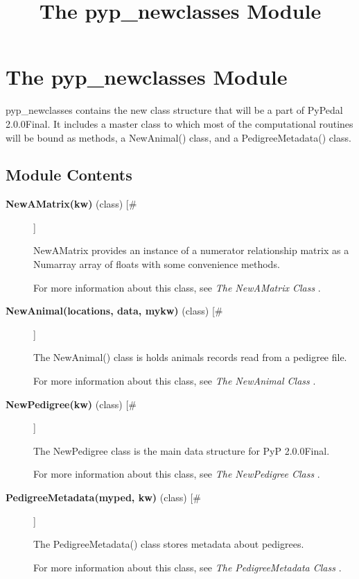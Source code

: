 \documentclass[10pt]{article}
\title{The pyp\_newclasses Module}
\begin{document}
\section*{The pyp\_newclasses Module}


 pyp\_newclasses contains the new class structure that will be a part of PyPedal 2.0.0Final. It includes a master class to which most of the computational routines will be bound as methods, a NewAnimal() class, and a PedigreeMetadata() class.
\subsection*{Module Contents}
\begin{description}
\item[\textbf{NewAMatrix(kw)}
 (class) [\#]]

 NewAMatrix provides an instance of a numerator relationship matrix as a Numarray array of floats with some convenience methods.


 For more information about this class, see \emph{The NewAMatrix Class}
.

\item[\textbf{NewAnimal(locations, data, mykw)}
 (class) [\#]]

 The NewAnimal() class is holds animals records read from a pedigree file.


 For more information about this class, see \emph{The NewAnimal Class}
.

\item[\textbf{NewPedigree(kw)}
 (class) [\#]]

 The NewPedigree class is the main data structure for PyP 2.0.0Final.


 For more information about this class, see \emph{The NewPedigree Class}
.

\item[\textbf{PedigreeMetadata(myped, kw)}
 (class) [\#]]

 The PedigreeMetadata() class stores metadata about pedigrees.


 For more information about this class, see \emph{The PedigreeMetadata Class}
.


\end{description}
\end{document}
